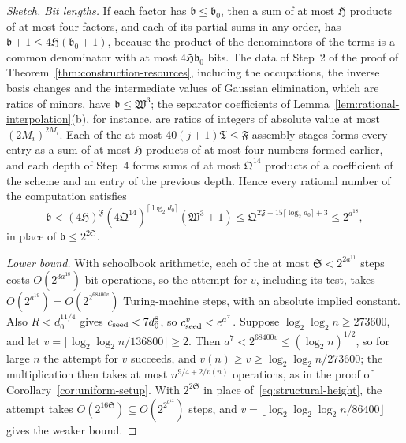 \begin{proof}[Sketch]
\emph{Bit lengths.} If each factor has \(\mathfrak b\le\mathfrak b_0\),
then a sum of at most \(\mathfrak H\) products of at most four factors,
and each of its partial sums in any order, has
\(\mathfrak b+1\le4\mathfrak H(\mathfrak b_0+1)\), because the product
of the denominators of the terms is a common denominator with at most
\(4\mathfrak H\mathfrak b_0\) bits. The data of Step~2 of the proof of
Theorem~\ref{thm:construction-resources}, including the occupations, the
inverse basis changes and the intermediate values of Gaussian
elimination, which are ratios of minors, have
\(\mathfrak b\le\mathfrak W^3\); the separator coefficients of
Lemma~\ref{lem:rational-interpolation}(b), for instance, are ratios of
integers of absolute value at most \((2M_i)^{2M_i}\). Each of the at most
\(40(j+1)\mathfrak T\le\mathfrak F\) assembly stages forms every entry as
a sum of at most \(\mathfrak H\) products of at most four numbers formed
earlier, and each depth of Step~4 forms sums of at most
\(\mathfrak Q^{14}\) products of a coefficient of the scheme and an
entry of the previous depth. Hence every rational number of the
computation satisfies
\begin{equation}\label{eq:structural-height}
 \mathfrak b<(4\mathfrak H)^{\mathfrak F}
 (4\mathfrak Q^{14})^{\lceil\log_2d_0\rceil}(\mathfrak W^3+1)
 \le\mathfrak Q^{2\mathfrak F+15\lceil\log_2d_0\rceil+3}\le2^{a^{18}},
\end{equation}
in place of \(\mathfrak b\le2^{2\mathfrak S}\).

\emph{Lower bound.} With schoolbook arithmetic, each of the at most
\(\mathfrak S<2^{2a^{11}}\) steps costs \(O(2^{3a^{18}})\) bit
operations, so the attempt for \(v\), including its test, takes
\(O(2^{a^{19}})=O(2^{2^{68400v}})\) Turing-machine steps, with an
absolute implied constant. Also \(R<d_0^{11/4}\) gives \(c_{\rm seed}<7d_0^8\), so
\(c_{\rm seed}^v<e^{a^7}\). Suppose \(\log_2\log_2n\ge273600\), and let
\(v=\lfloor\log_2\log_2n/136800\rfloor\ge2\). Then
\(a^7<2^{68400v}\le(\log_2n)^{1/2}\), so for large \(n\) the attempt
for \(v\) succeeds, and
\(v(n)\ge v\ge\log_2\log_2n/273600\); the multiplication then takes at
most \(n^{9/4+2/v(n)}\) operations, as in the proof of
Corollary~\ref{cor:uniform-setup}. With \(2^{2\mathfrak S}\) in place
of~\eqref{eq:structural-height}, the attempt takes
\(O(2^{16\mathfrak S})\subseteq O(2^{2^{a^{12}}})\) steps, and
\(v=\lfloor\log_2\log_2\log_2n/86400\rfloor\) gives the weaker bound.
\end{proof}
